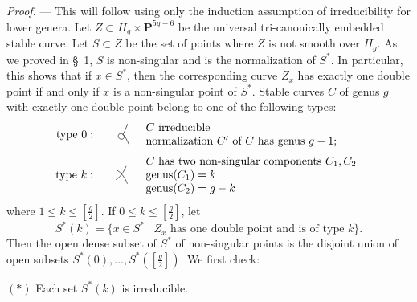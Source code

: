 \documentclass[10pt]{article}
\newcommand{\PP}{\mathbf P}
\begin{document}
\noindent\emph{Proof.} --- This will follow using only the induction assumption of irreducibility for lower genera. Let $Z\subset H_g\times\PP^{5g-6}$ be the universal tri-canonically embedded stable curve. Let $S\subset Z$ be the set of points where $Z$ is not smooth over $H_g$. As we proved in \S~1, $S$ is non-singular and is the normalization of $S^*$. In particular, this shows that if $x\in S^*$, then the corresponding curve $Z_x$ has exactly one double point if and only if $x$ is a non-singular point of $S^*$. Stable curves $C$ of genus $g$ with exactly one double point belong to one of the following types:
\[
\begin{array}{rcll}
\text{type }0:&&
\begin{tikzpicture}[scale=.32,baseline=-.7ex,line width=.45pt]
\draw (0,0).. controls (-.40,.30) and (-.70,-.28)..(-.22,-.47)
             .. controls (.08,-.52) and (.25,-.22)..(0,0);
\draw (0,0).. controls (.22,.34) and (.28,.65)..(.43,.95);
\draw (0,0).. controls (.24,-.27) and (.42,-.58)..(.57,-.96);
\end{tikzpicture}
& \begin{array}{l}C\text{ irreducible}\\
\text{normalization }C'\text{ of }C\text{ has genus }g-1;
\end{array}\\[1.2em]
\text{type }k:&&
\begin{tikzpicture}[scale=.32,baseline=-.7ex,line width=.45pt]
\draw (-.55,-.46).. controls (-.22,-.33) and (.26,.31)..(.46,.86);
\draw (-.47,.46).. controls (-.12,.31) and (.36,-.24)..(.58,-.87);
\end{tikzpicture}
& \begin{array}{l}C\text{ has two non-singular components }C_1,C_2\\
\operatorname{genus}(C_1)=k\\
\operatorname{genus}(C_2)=g-k
\end{array}
\end{array}
\]
where $1\leq k\leq\left[\frac g2\right]$. If $0\leq k\leq\left[\frac g2\right]$, let
\[
S^*(k)=\{x\in S^*\mid Z_x\text{ has one double point and is of type }k\}.
\]
Then the open dense subset of $S^*$ of non-singular points is the disjoint union of open subsets $S^*(0),\ldots,S^*(\left[\frac g2\right])$. We first check:

\medskip
\noindent$(*)$ Each set $S^*(k)$ is irreducible.
\end{document}
